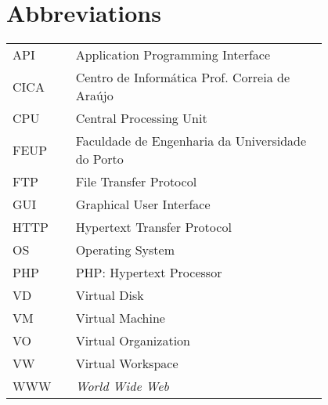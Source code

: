 \chapter*{Abbreviations}

\begin{flushleft}
\begin{tabular}{l p{0.8\linewidth}}
API	 & Application Programming Interface\\
CICA	 & Centro de Informática Prof. Correia de Araújo\\
CPU	 & Central Processing Unit\\
FEUP	 & Faculdade de Engenharia da Universidade do Porto\\
FTP	 & File Transfer Protocol\\
GUI	 & Graphical User Interface\\
HTTP	 & Hypertext Transfer Protocol\\
OS	 & Operating System\\
PHP	 & PHP: Hypertext Processor\\
VD	 & Virtual Disk\\
VM	 & Virtual Machine\\
VO	 & Virtual Organization\\
VW	 & Virtual Workspace\\
WWW      & \emph{World Wide Web}
\end{tabular}
\end{flushleft}

